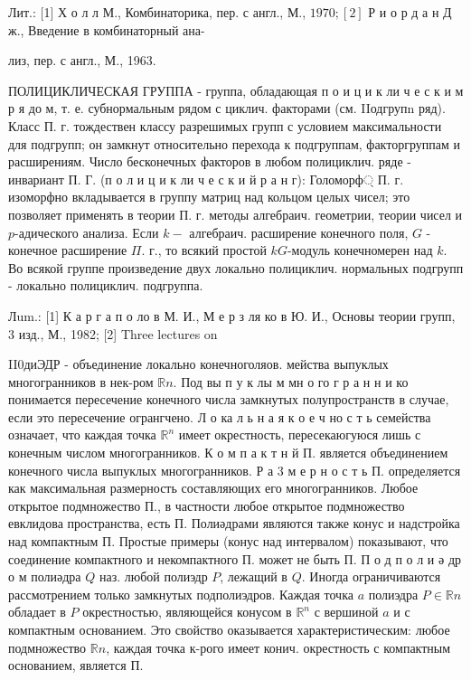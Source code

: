 \documentclass[10pt]{article}
\begin{document}
Лит.: [1] Х о л л М., Комбинаторика, пер. с англ., М., $1970 ;[2]$ Р и о р д а н Д ж., Введение в комбинаторный ана-

лиз, пер. с англ., М., 1963.



ПОЛИЦИКЛИЧЕСКАЯ ГРУППА - группа, обладающая п о и ц и к ли ч е с к и м р я до м, т. е. субнормальным рядом с циклич. факторами (см. IIодгрупn ряд). Класс П. г. тождествен классу разрешимых групп с условием максимальности для подгрупп; он замкнут относительно перехода к подгруппам, факторгруппам и расширениям. Число бесконечных факторов в любом полициклич. ряде - инвариант П. Г. (п о л и ц и к ли ч е с к и й р а н г): Голоморф্ П. г. изоморфно вкладывается в группу матриц над кольцом целых чисел; это позволяет применять в теории П. г. методы алгебраич. геометрии, теории чисел и $p$-адического анализа. Если $k-$ алгебраич. расширение конечного поля, $G$ - конечное расширение $\Pi$. г., то всякий простой $k G$-модуль конечномерен над $k$. Во всякой группе произведение двух локально полициклич. нормальных подгрупп - локально полициклич. подгруппа.



Лum.: [1] К а р г а п о ло в М. И., М е р з ля ко в Ю. И., Основы теории групп, 3 изд., М., 1982; [2] Three lectures on



II0диЭДР - объединение локально конечноголяов. мейства выпуклых многогранников в нек-ром $\mathbb{R} n$. Под вы п у к лы м мн о го г р а н н и ко понимается пересечение конечного числа замкнутых полупространств в случае, если это пересечение огрангчено. Л о ка л ь н а я к о е ч но с т ь семейства означает, что каждая точка $\mathbb{R}^{n}$ имеет окрестность, пересекаюгуюся лишь с конечным числом многогранников. К о м п а к т н й П. является объединением конечного числа выпуклых многогранников. Р а 3 м е р н о с т ь П. определяется как максимальная размерность составляющих его многогранников. Любое открытое подмножество П., в частности любое открытое подмножество евклидова пространства, есть П. Полиәдрами являются также конус и надстройка над компактным П. Простые примеры (конус над интервалом) показывают, что соединение компактного и некомпактного П. может не быть П. П о д п о л и ә др о м полиәдра $Q$ наз. любой полиэдр $P$, лежащий в $Q$. Иногда ограничиваются рассмотрением только замкнутых подполиэдров. Каждая точка $a$ полиэдра $P \in \mathbb{R} n$ обладает в $P$ окрестностью, являющейся конусом в $\mathbb{R}^{n}$ с вершиной $a$ и с компактным основанием. Это свойство оказывается характеристическим: любое подмножество $\mathbb{R} n$, каждая точка к-рого имеет конич. окрестность с компактным основанием, является П.
\end{document}
